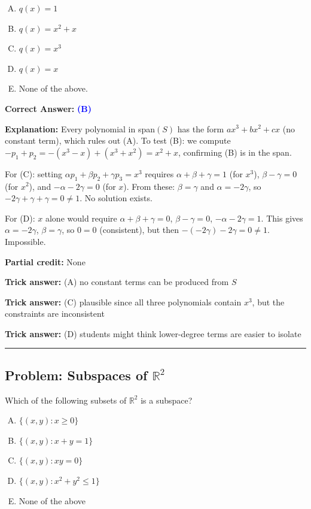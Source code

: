 \documentclass[12pt]{amsart}
\newcommand{\divider}{
  \vspace{-1em}
  \noindent
  \raisebox{-0.15ex}{\textbullet}%
  \hspace{0.5em}%
  \rule[0.5ex]{0.95\textwidth}{1.0pt}%
  \hspace{0.5em}%
  \raisebox{-0.15ex}{\textbullet}%
  \vspace{0em}
}
\begin{document}
\begin{enumerate}[(A)]
\item $q(x) = 1$
\item $q(x) = x^2 + x$
\item $q(x) = x^3$
\item $q(x) = x$
\item None of the above.
\end{enumerate}

\textbf{Correct Answer:} \textcolor{blue}{\textbf{(B)}}

\textbf{Explanation:} Every polynomial in span$(S)$ has the form $ax^3 + bx^2 + cx$ (no constant term), which rules out (A). To test (B): we compute $-p_1 + p_2 = -(x^3-x) + (x^3+x^2) = x^2 + x$, confirming (B) is in the span.

For (C): setting $\alpha p_1 + \beta p_2 + \gamma p_3 = x^3$ requires $\alpha + \beta + \gamma = 1$ (for $x^3$), $\beta - \gamma = 0$ (for $x^2$), and $-\alpha - 2\gamma = 0$ (for $x$). From these: $\beta = \gamma$ and $\alpha = -2\gamma$, so $-2\gamma + \gamma + \gamma = 0 \neq 1$. No solution exists.

For (D): $x$ alone would require $\alpha + \beta + \gamma = 0$, $\beta - \gamma = 0$, $-\alpha - 2\gamma = 1$. This gives $\alpha = -2\gamma$, $\beta = \gamma$, so $0 = 0$ (consistent), but then $-(-2\gamma) - 2\gamma = 0 \neq 1$. Impossible.

\textbf{Partial credit:} None

\textbf{Trick answer:} (A) no constant terms can be produced from $S$

\textbf{Trick answer:} (C) plausible since all three polynomials contain $x^3$, but the constraints are inconsistent

\textbf{Trick answer:} (D) students might think lower-degree terms are easier to isolate

\divider

\subsection*{Problem: Subspaces of $\mathbb{R}^2$}

Which of the following subsets of $\mathbb{R}^2$ is a subspace?

\begin{enumerate}[(A)]
\item $\{(x, y) : x \geq 0\}$
\item $\{(x, y) : x + y = 1\}$
\item $\{(x, y) : xy = 0\}$ 
\item $\{(x, y) : x^2 + y^2 \leq 1\}$ 
\item None of the above
\end{enumerate}
\end{document}
